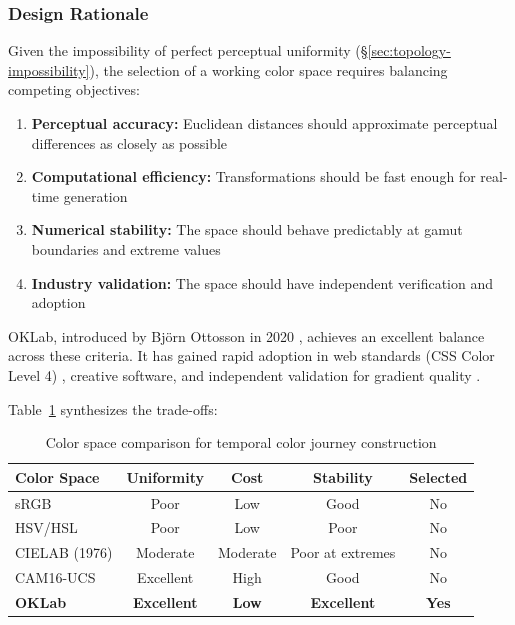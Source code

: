 \subsubsection{Design Rationale}

Given the impossibility of perfect perceptual uniformity (\S\ref{sec:topology-impossibility}), the selection of a working color space requires balancing competing objectives:

\begin{enumerate}
    \item \textbf{Perceptual accuracy:} Euclidean distances should approximate perceptual differences as closely as possible
    \item \textbf{Computational efficiency:} Transformations should be fast enough for real-time generation
    \item \textbf{Numerical stability:} The space should behave predictably at gamut boundaries and extreme values
    \item \textbf{Industry validation:} The space should have independent verification and adoption
\end{enumerate}

OKLab, introduced by Björn Ottosson in 2020 \citep{ottosson2020}, achieves an excellent balance across these criteria. It has gained rapid adoption in web standards (CSS Color Level 4) \citep{csscolor4}, creative software, and independent validation for gradient quality \citep{levien2021oklab}.

Table~\ref{tab:color-space-comparison} synthesizes the trade-offs:

\begin{table}[htbp]
\centering
\caption{Color space comparison for temporal color journey construction}
\label{tab:color-space-comparison}
\begin{tabular}{lcccc}
\toprule
\textbf{Color Space} & \textbf{Uniformity} & \textbf{Cost} & \textbf{Stability} & \textbf{Selected} \\
\midrule
sRGB & Poor & Low & Good & No \\
HSV/HSL & Poor & Low & Poor & No \\
CIELAB (1976) & Moderate & Moderate & Poor at extremes & No \\
CAM16-UCS & Excellent & High & Good & No \\
\textbf{OKLab} & \textbf{Excellent} & \textbf{Low} & \textbf{Excellent} & \textbf{Yes} \\
\bottomrule
\end{tabular}
\end{table}

